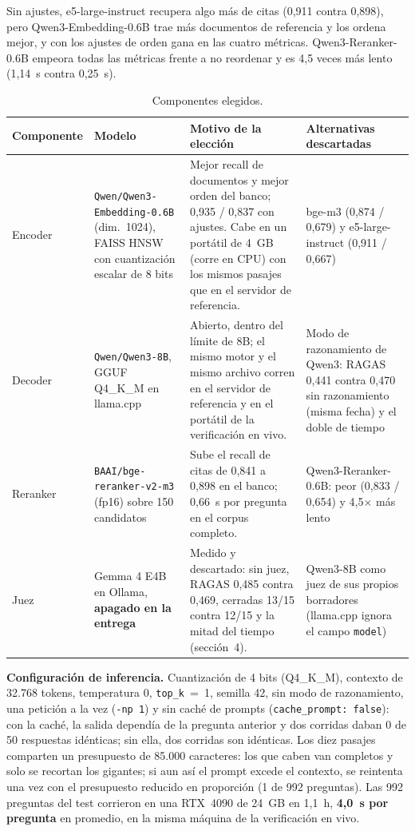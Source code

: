 \documentclass[10pt,twocolumn,letterpaper]{article}
\newcommand{\cod}[1]{\texttt{#1}}
\begin{document}
Sin ajustes, e5-large-instruct recupera algo más de citas (0,911 contra 0,898), pero
Qwen3-Embedding-0.6B trae más documentos de referencia y los ordena mejor, y con los
ajustes de orden gana en las cuatro métricas. Qwen3-Reranker-0.6B empeora todas las
métricas frente a no reordenar y es 4,5 veces más lento (1,14~s contra 0,25~s).

\begin{table}[t]
\centering\footnotesize
\caption{Componentes elegidos.}
\label{tab:componentes}
\begin{tabularx}{\textwidth}{@{}l>{\raggedright\arraybackslash}p{4.1cm}>{\raggedright\arraybackslash}X>{\raggedright\arraybackslash}p{4.4cm}@{}}
\toprule
Componente & Modelo & Motivo de la elección & Alternativas descartadas \\
\midrule
Encoder & \cod{Qwen/Qwen3-Embedding-0.6B} (dim.\ 1024), FAISS HNSW con cuantización
escalar de 8 bits &
Mejor recall de documentos y mejor orden del banco; 0,935 / 0,837 con ajustes. Cabe en
un portátil de 4~GB (corre en CPU) con los mismos pasajes que en el servidor de
referencia. &
bge-m3 (0,874 / 0,679) y e5-large-instruct (0,911 / 0,667) \\
Decoder & \cod{Qwen/Qwen3-8B}, GGUF Q4\_K\_M en llama.cpp &
Abierto, dentro del límite de 8B; el mismo motor y el mismo archivo corren en el
servidor de referencia y en el portátil de la verificación en vivo. &
Modo de razonamiento de Qwen3: RAGAS 0,441 contra 0,470 sin razonamiento (misma fecha) y el doble de tiempo \\
Reranker & \cod{BAAI/bge-reranker-v2-m3} (fp16) sobre 150 candidatos &
Sube el recall de citas de 0,841 a 0,898 en el banco; 0,66~s por pregunta en el corpus
completo. &
Qwen3-Reranker-0.6B: peor (0,833 / 0,654) y 4,5$\times$ más lento \\
Juez & Gemma 4 E4B en Ollama, \textbf{apagado en la entrega} &
Medido y descartado: sin juez, RAGAS 0,485 contra 0,469, cerradas 13/15 contra 12/15 y
la mitad del tiempo (sección~4). &
Qwen3-8B como juez de sus propios borradores (llama.cpp ignora el campo \cod{model}) \\
\bottomrule
\end{tabularx}
\end{table}

\textbf{Configuración de inferencia.} Cuantización de 4 bits (Q4\_K\_M), contexto de
32.768 tokens, temperatura 0, \cod{top\_k}~=~1, semilla 42, sin modo de razonamiento,
una petición a la vez (\cod{-np 1}) y sin caché de prompts (\cod{cache\_prompt:
false}): con la caché, la salida dependía de la pregunta anterior y dos corridas daban
0 de 50 respuestas idénticas; sin ella, dos corridas son idénticas. Los diez pasajes
comparten un presupuesto de 85.000 caracteres: los que caben van completos y solo se
recortan los gigantes; si aun así el prompt excede el contexto, se reintenta una vez con
el presupuesto reducido en proporción (1 de 992 preguntas). Las 992 preguntas del test
corrieron en una RTX~4090 de 24~GB en 1,1~h, \textbf{4,0~s por pregunta} en promedio,
en la misma máquina de la verificación en vivo.
\end{document}
